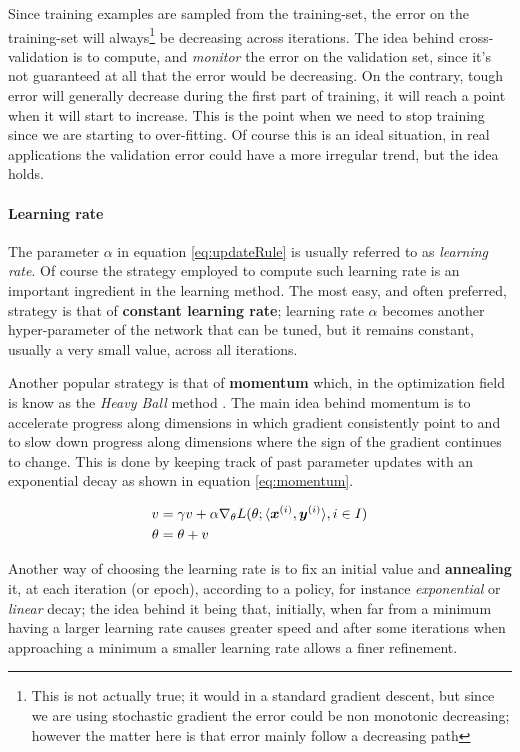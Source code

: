 Since training examples are sampled from the training-set, the error on the training-set will always\footnote{This is not actually true; it would in a standard gradient descent, but since we are using stochastic gradient the error could be non monotonic decreasing; however the matter here is that error mainly follow a decreasing path} be decreasing across iterations. The idea behind cross-validation is to compute, and \textit{monitor} the error on the validation set, since it's not guaranteed at all that the error would be decreasing. On the contrary, tough error will generally decrease during the first part of training, it will reach a point when it will start to increase. This is the point when we need to stop training since we are starting to over-fitting. Of course this is an ideal situation, in real applications the validation error could have a more irregular trend, but the idea holds.


\paragraph{Learning rate}

The parameter $\alpha$ in equation \ref{eq:updateRule} is usually referred to as \textit{learning rate}. Of course the strategy employed to compute such learning rate is an important ingredient in the learning method.
The most easy, and often preferred, strategy is that of \textbf{constant learning rate}; learning rate $\alpha$ becomes another hyper-parameter of the network that can be tuned, but it remains constant, usually a very small value, across all iterations.

Another popular strategy is that of \textbf{momentum} which, in the optimization field is know as the \textit{Heavy 
Ball} method \cite{momentum}.
The main idea behind momentum is to accelerate progress along dimensions
in which gradient consistently point to and to slow down progress along dimensions where the sign of the gradient continues to change. This is done by keeping
track of past parameter updates with an exponential decay as shown in equation \ref{eq:momentum}.

\begin{align}
\label{eq:momentum}
v &= \gamma v+ \alpha \nabla_\theta L(\theta; \langle\boldsymbol{x}^{(i)},\boldsymbol{y}^{(i)}\rangle, i\in I)\\
\theta &= \theta + v
\end{align}

Another way of choosing the learning rate is to fix an initial value and \textbf{annealing} it, at each iteration (or epoch), according to a policy, for instance \textit{exponential} or \textit{linear} decay; the idea behind it being that, initially, when far from a minimum having a larger learning rate causes greater speed and after some iterations when approaching a minimum a smaller learning rate allows a finer refinement.

